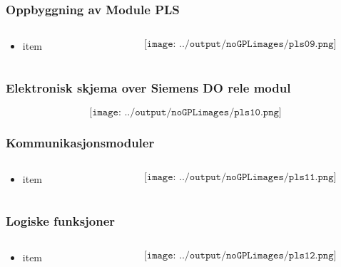 \documentclass[aspectratio=169,xcolor=dvipsnames]{beamer}
\begin{document}
\begin{frame}
	\frametitle{Oppbyggning av Module PLS}
	\begin{columns}
		\begin{column}{0.5\textwidth}
			\begin{itemize}
				\item item
			\end{itemize}

			
		\end{column}

		\begin{column}{0.5\textwidth}
	$$\texttt{[image: ../output/noGPLimages/pls09.png]}$$
		\end{column}
	\end{columns}
\end{frame}

\begin{frame}
	\frametitle{Elektronisk skjema over Siemens DO rele modul}
	$$\texttt{[image: ../output/noGPLimages/pls10.png]}$$
\end{frame}

\begin{frame}
	\frametitle{Kommunikasjonsmoduler}
	\begin{columns}
		\begin{column}{0.5\textwidth}
			\begin{itemize}
				\item item
			\end{itemize}

			
		\end{column}

		\begin{column}{0.5\textwidth}
	$$\texttt{[image: ../output/noGPLimages/pls11.png]}$$
		\end{column}
	\end{columns}
\end{frame}

\begin{frame}
	\frametitle{Logiske funksjoner}
	\begin{columns}
		\begin{column}{0.5\textwidth}
			\begin{itemize}
				\item item
			\end{itemize}

			
		\end{column}

		\begin{column}{0.5\textwidth}
	$$\texttt{[image: ../output/noGPLimages/pls12.png]}$$
		\end{column}
	\end{columns}
\end{frame}
\end{document}
